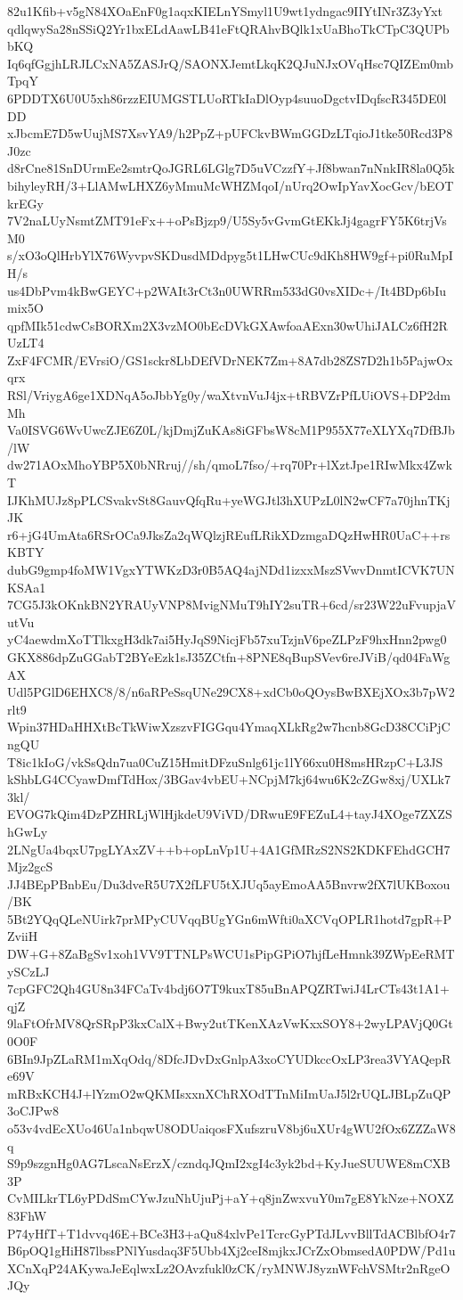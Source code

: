 82u1Kfib+v5gN84XOaEnF0g1aqxKIELnYSmyl1U9wt1ydngac9IIYtINr3Z3yYxt
qdlqwySa28nSSiQ2Yr1bxELdAawLB41eFtQRAhvBQlk1xUaBhoTkCTpC3QUPbbKQ
Iq6qfGgjhLRJLCxNA5ZASJrQ/SAONXJemtLkqK2QJuNJxOVqHsc7QIZEm0mbTpqY
6PDDTX6U0U5xh86rzzEIUMGSTLUoRTkIaDlOyp4suuoDgctvIDqfscR345DE0lDD
xJbcmE7D5wUujMS7XsvYA9/h2PpZ+pUFCkvBWmGGDzLTqioJ1tke50Rcd3P8J0zc
d8rCne81SnDUrmEe2smtrQoJGRL6LGlg7D5uVCzzfY+Jf8bwan7nNnkIR8la0Q5k
bihyleyRH/3+LlAMwLHXZ6yMmuMcWHZMqoI/nUrq2OwIpYavXocGcv/bEOTkrEGy
7V2naLUyNsmtZMT91eFx++oPsBjzp9/U5Sy5vGvmGtEKkJj4gagrFY5K6trjVsM0
s/xO3oQlHrbYlX76WyvpvSKDusdMDdpyg5t1LHwCUc9dKh8HW9gf+pi0RuMpIH/s
us4DbPvm4kBwGEYC+p2WAIt3rCt3n0UWRRm533dG0vsXIDc+/It4BDp6bIumix5O
qpfMIk51cdwCsBORXm2X3vzMO0bEcDVkGXAwfoaAExn30wUhiJALCz6fH2RUzLT4
ZxF4FCMR/EVrsiO/GS1sckr8LbDEfVDrNEK7Zm+8A7db28ZS7D2h1b5PajwOxqrx
RSl/VriygA6ge1XDNqA5oJbbYg0y/waXtvnVuJ4jx+tRBVZrPfLUiOVS+DP2dmMh
Va0ISVG6WvUwcZJE6Z0L/kjDmjZuKAs8iGFbsW8cM1P955X77eXLYXq7DfBJb/lW
dw271AOxMhoYBP5X0bNRruj//sh/qmoL7fso/+rq70Pr+lXztJpe1RIwMkx4ZwkT
IJKhMUJz8pPLCSvakvSt8GauvQfqRu+yeWGJtl3hXUPzL0lN2wCF7a70jhnTKjJK
r6+jG4UmAta6RSrOCa9JksZa2qWQlzjREufLRikXDzmgaDQzHwHR0UaC++rsKBTY
dubG9gmp4foMW1VgxYTWKzD3r0B5AQ4ajNDd1izxxMszSVwvDnmtICVK7UNKSAa1
7CG5J3kOKnkBN2YRAUyVNP8MvigNMuT9hIY2suTR+6cd/sr23W22uFvupjaVutVu
yC4aewdmXoTTlkxgH3dk7ai5HyJqS9NicjFb57xuTzjnV6peZLPzF9hxHnn2pwg0
GKX886dpZuGGabT2BYeEzk1sJ35ZCtfn+8PNE8qBupSVev6reJViB/qd04FaWgAX
Udl5PGlD6EHXC8/8/n6aRPeSsqUNe29CX8+xdCb0oQOysBwBXEjXOx3b7pW2rlt9
Wpin37HDaHHXtBcTkWiwXzszvFIGGqu4YmaqXLkRg2w7hcnb8GcD38CCiPjCngQU
T8ic1kIoG/vkSsQdn7ua0CuZ15HmitDFzuSnlg61jc1lY66xu0H8msHRzpC+L3JS
kShbLG4CCyawDmfTdHox/3BGav4vbEU+NCpjM7kj64wu6K2cZGw8xj/UXLk73kl/
EVOG7kQim4DzPZHRLjWlHjkdeU9ViVD/DRwuE9FEZuL4+tayJ4XOge7ZXZShGwLy
2LNgUa4bqxU7pgLYAxZV++b+opLnVp1U+4A1GfMRzS2NS2KDKFEhdGCH7Mjz2gcS
JJ4BEpPBnbEu/Du3dveR5U7X2fLFU5tXJUq5ayEmoAA5Bnvrw2fX7lUKBoxou/BK
5Bt2YQqQLeNUirk7prMPyCUVqqBUgYGn6mWfti0aXCVqOPLR1hotd7gpR+PZviiH
DW+G+8ZaBgSv1xoh1VV9TTNLPsWCU1sPipGPiO7hjfLeHmnk39ZWpEeRMTySCzLJ
7cpGFC2Qh4GU8n34FCaTv4bdj6O7T9kuxT85uBnAPQZRTwiJ4LrCTs43t1A1+qjZ
9laFtOfrMV8QrSRpP3kxCalX+Bwy2utTKenXAzVwKxxSOY8+2wyLPAVjQ0Gt0O0F
6BIn9JpZLaRM1mXqOdq/8DfcJDvDxGnlpA3xoCYUDkccOxLP3rea3VYAQepRe69V
mRBxKCH4J+lYzmO2wQKMIsxxnXChRXOdTTnMiImUaJ5l2rUQLJBLpZuQP3oCJPw8
o53v4vdEcXUo46Ua1nbqwU8ODUaiqosFXufszruV8bj6uXUr4gWU2fOx6ZZZaW8q
S9p9szgnHg0AG7LscaNsErzX/czndqJQmI2xgI4c3yk2bd+KyJueSUUWE8mCXB3P
CvMILkrTL6yPDdSmCYwJzuNhUjuPj+aY+q8jnZwxvuY0m7gE8YkNze+NOXZ83FhW
P74yHfT+T1dvvq46E+BCe3H3+aQu84xlvPe1TcrcGyPTdJLvvBllTdACBlbfO4r7
B6pOQ1gHiH87lbssPNlYusdaq3F5Ubb4Xj2ceI8mjkxJCrZxObmsedA0PDW/Pd1u
XCnXqP24AKywaJeEqlwxLz2OAvzfukl0zCK/ryMNWJ8yznWFchVSMtr2nRgeOJQy
